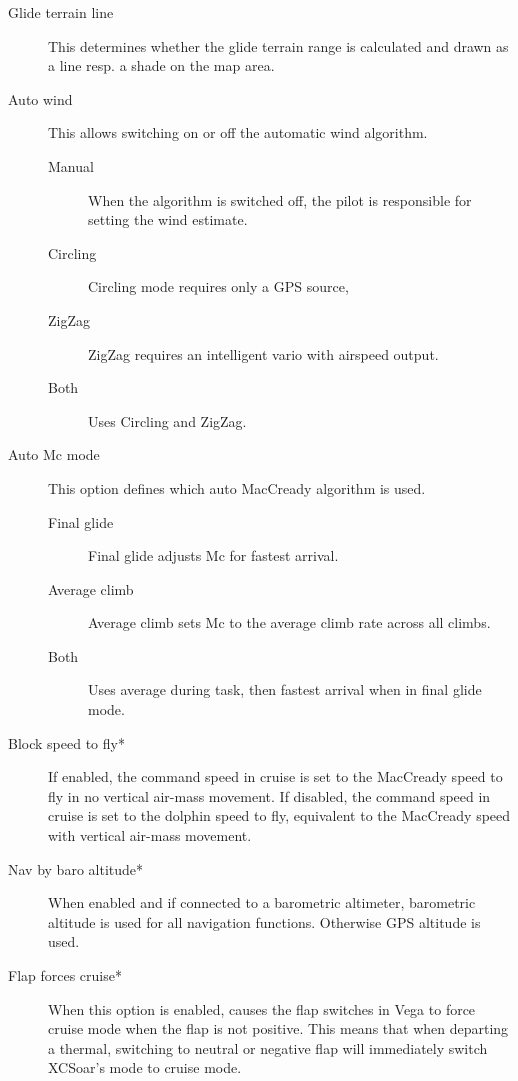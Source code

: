 \documentclass[a4paper,12pt]{refrep}
\begin{document}
\begin{description}
\item[Glide terrain line]  This determines whether the
glide terrain range is calculated and drawn as a line resp. a shade on the map area.
\item[Auto wind] This allows switching on or off the automatic wind algorithm.
 \begin{description}
\item[Manual] When the algorithm is switched off, the pilot is responsible for
  setting the wind estimate.
\item[Circling] Circling mode requires only a GPS source, 
\item[ZigZag]  ZigZag requires an intelligent vario with airspeed output.
\item[Both] Uses Circling and ZigZag.
\end{description}
\item[Auto Mc mode] This option defines which auto MacCready algorithm is used.
 \begin{description}
\item[Final glide] Final glide adjusts Mc for fastest arrival.
\item[Average climb]  Average climb sets Mc to the average climb rate across all climbs.
\item[Both] Uses average during task, then fastest arrival when in final glide mode.
\end{description}
\item[Block speed to fly*] If enabled, the command speed in cruise
  is set to the MacCready speed to fly in no vertical air-mass movement.
  If disabled, the command speed in cruise is set to the dolphin speed to fly,
  equivalent to the MacCready speed with vertical air-mass movement.
\item[Nav by baro altitude*] When enabled and if connected to a barometric
  altimeter, barometric altitude is used for all navigation functions. Otherwise
  GPS altitude is used.
\item[Flap forces cruise*]
  When this option is enabled, causes the flap switches in Vega to
  force cruise mode when the flap is not positive.  This means that
  when departing a thermal, switching to neutral or negative flap will
  immediately switch XCSoar's mode to cruise mode.


\end{description}
\end{document}
